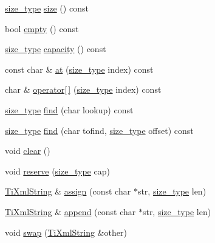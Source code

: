 \begin{DoxyCompactItemize}
\item 
\hyperlink{class_ti_xml_string_abeb2c1893a04c17904f7c06546d0b971}{size\_\-type} \hyperlink{class_ti_xml_string_a96103e5c0f67e987fa48527e1f47a1f6}{size} () const 
\item 
bool \hyperlink{class_ti_xml_string_a9a61e1d11cdb71bea4a4ed79caa793f4}{empty} () const 
\item 
\hyperlink{class_ti_xml_string_abeb2c1893a04c17904f7c06546d0b971}{size\_\-type} \hyperlink{class_ti_xml_string_a76e4d6aba7845f4cf9c02332a5fbf916}{capacity} () const 
\item 
const char \& \hyperlink{class_ti_xml_string_a6763093267bbdecbf03f8840bc349877}{at} (\hyperlink{class_ti_xml_string_abeb2c1893a04c17904f7c06546d0b971}{size\_\-type} index) const 
\item 
char \& \hyperlink{class_ti_xml_string_ae8cdc1d46c538536b786f7ae03c0c1d9}{operator\mbox{[}$\,$\mbox{]}} (\hyperlink{class_ti_xml_string_abeb2c1893a04c17904f7c06546d0b971}{size\_\-type} index) const 
\item 
\hyperlink{class_ti_xml_string_abeb2c1893a04c17904f7c06546d0b971}{size\_\-type} \hyperlink{class_ti_xml_string_a5c2b368b5eafe075fd9565cbcbd4c2f9}{find} (char lookup) const 
\item 
\hyperlink{class_ti_xml_string_abeb2c1893a04c17904f7c06546d0b971}{size\_\-type} \hyperlink{class_ti_xml_string_a5f2a6fd565751410b392f249a9786db4}{find} (char tofind, \hyperlink{class_ti_xml_string_abeb2c1893a04c17904f7c06546d0b971}{size\_\-type} offset) const 
\item 
void \hyperlink{class_ti_xml_string_ab20e06e4c666abf3bdbfb3a1191d4888}{clear} ()
\item 
void \hyperlink{class_ti_xml_string_a88ecf9f0f00cb5c67b6b637958d7049c}{reserve} (\hyperlink{class_ti_xml_string_abeb2c1893a04c17904f7c06546d0b971}{size\_\-type} cap)
\item 
\hyperlink{class_ti_xml_string}{TiXmlString} \& \hyperlink{class_ti_xml_string_afe4cd3452ccd7cd8c8cac16e24ea28d7}{assign} (const char $\ast$str, \hyperlink{class_ti_xml_string_abeb2c1893a04c17904f7c06546d0b971}{size\_\-type} len)
\item 
\hyperlink{class_ti_xml_string}{TiXmlString} \& \hyperlink{class_ti_xml_string_a717b00190c8acdee94816d2f4f20e75a}{append} (const char $\ast$str, \hyperlink{class_ti_xml_string_abeb2c1893a04c17904f7c06546d0b971}{size\_\-type} len)
\item 
void \hyperlink{class_ti_xml_string_aa392cbc180752a79f007f4f9280c7762}{swap} (\hyperlink{class_ti_xml_string}{TiXmlString} \&other)
\end{DoxyCompactItemize}
